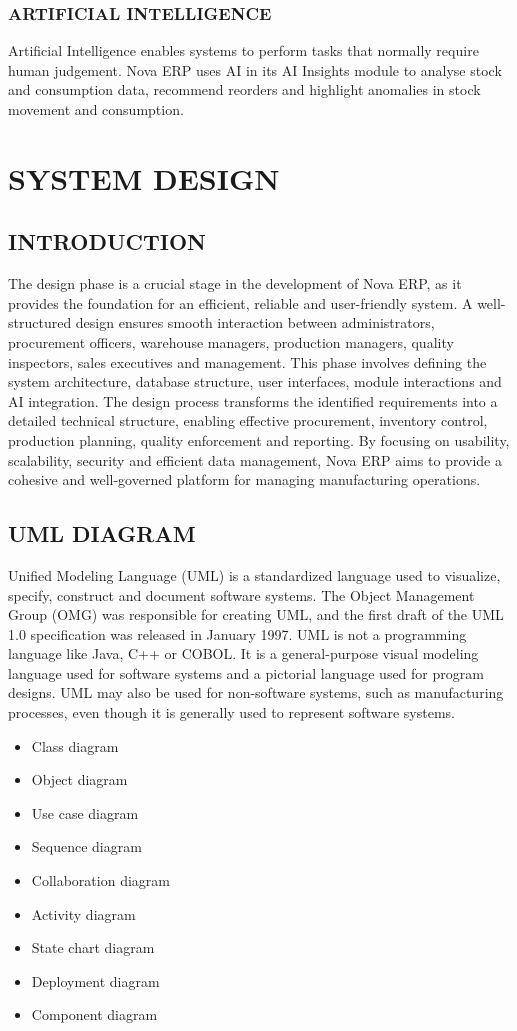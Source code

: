 \documentclass[12pt,a4paper]{report}
\newcommand{\chap}[1]{\chapter{#1}\thispagestyle{empty}\clearpage}
\begin{document}
\subsection{ARTIFICIAL INTELLIGENCE}
Artificial Intelligence enables systems to perform tasks that normally require human judgement. Nova ERP uses AI in its AI Insights module to analyse stock and consumption data, recommend reorders and highlight anomalies in stock movement and consumption.

\chap{SYSTEM DESIGN}

\section{INTRODUCTION}
The design phase is a crucial stage in the development of Nova ERP, as it provides the foundation for an efficient, reliable and user-friendly system. A well-structured design ensures smooth interaction between administrators, procurement officers, warehouse managers, production managers, quality inspectors, sales executives and management. This phase involves defining the system architecture, database structure, user interfaces, module interactions and AI integration. The design process transforms the identified requirements into a detailed technical structure, enabling effective procurement, inventory control, production planning, quality enforcement and reporting. By focusing on usability, scalability, security and efficient data management, Nova ERP aims to provide a cohesive and well-governed platform for managing manufacturing operations.

\section{UML DIAGRAM}
Unified Modeling Language (UML) is a standardized language used to visualize, specify, construct and document software systems. The Object Management Group (OMG) was responsible for creating UML, and the first draft of the UML 1.0 specification was released in January 1997. UML is not a programming language like Java, C++ or COBOL. It is a general-purpose visual modeling language used for software systems and a pictorial language used for program designs. UML may also be used for non-software systems, such as manufacturing processes, even though it is generally used to represent software systems.
\begin{itemize}
\item Class diagram
\item Object diagram
\item Use case diagram
\item Sequence diagram
\item Collaboration diagram
\item Activity diagram
\item State chart diagram
\item Deployment diagram
\item Component diagram
\end{itemize}
\end{document}
